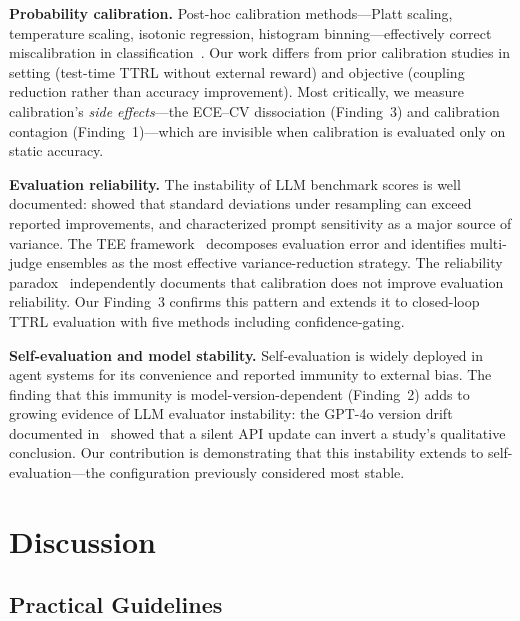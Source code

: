 \documentclass[11pt]{article}
\theoremstyle{definition}
\theoremstyle{remark}
\begin{document}
\textbf{Probability calibration.} Post-hoc calibration methods---Platt scaling, temperature scaling, isotonic regression, histogram binning---effectively correct miscalibration in classification~\cite{guo2017calibration,niculescu2005predicting}. Our work differs from prior calibration studies in setting (test-time TTRL without external reward) and objective (coupling reduction rather than accuracy improvement). Most critically, we measure calibration's \textit{side effects}---the ECE--CV dissociation (Finding~3) and calibration contagion (Finding~1)---which are invisible when calibration is evaluated only on static accuracy.

\textbf{Evaluation reliability.} The instability of LLM benchmark scores is well documented: \citet{dodge2019reproducibility} showed that standard deviations under resampling can exceed reported improvements, and \citet{sclar2024quantifying} characterized prompt sensitivity as a major source of variance. The TEE framework~\cite{messing2026tee} decomposes evaluation error and identifies multi-judge ensembles as the most effective variance-reduction strategy. The reliability paradox~\cite{he2026paradox} independently documents that calibration does not improve evaluation reliability. Our Finding~3 confirms this pattern and extends it to closed-loop TTRL evaluation with five methods including confidence-gating.

\textbf{Self-evaluation and model stability.} Self-evaluation is widely deployed in agent systems for its convenience and reported immunity to external bias. The finding that this immunity is model-version-dependent (Finding~2) adds to growing evidence of LLM evaluator instability: the GPT-4o version drift documented in~\cite{epc2026} showed that a silent API update can invert a study's qualitative conclusion. Our contribution is demonstrating that this instability extends to self-evaluation---the configuration previously considered most stable.



\section{Discussion}

\subsection{Practical Guidelines}
\end{document}
